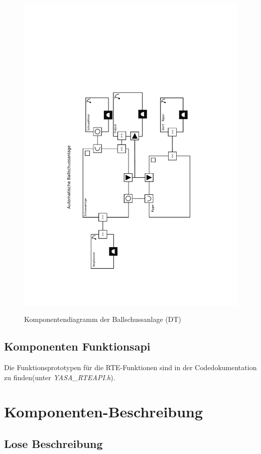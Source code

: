 \documentclass[a4paper,11pt]{scrreprt}
\begin{document}
\begin{figure}[htbp]
 \centering
 \includegraphics[scale=.75]{./KomponentenDiagramm.pdf}
 \label{fig:komponentendiag}
 \caption{Komponentendiagramm der Ballschussanlage (DT)}
\end{figure}

\section{Komponenten Funktionsapi}
Die Funktionsprototypen für die RTE-Funktionen sind in der Codedokumentation zu finden(unter \textit{YASA\_RTEAPI.h}).

\chapter{Komponenten-Beschreibung}

\section{Lose Beschreibung}
\end{document}
